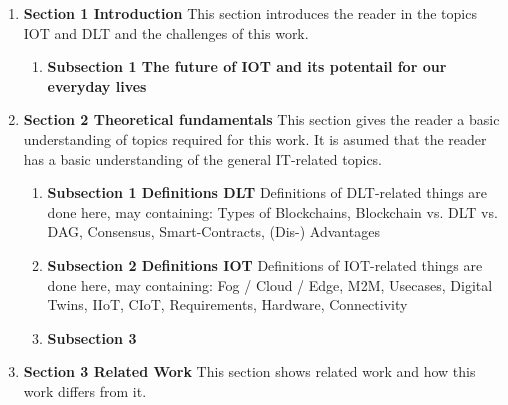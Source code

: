 \documentclass[
    ngerman,american
    ]{scrartcl}
\newcommand{\lang}{en}
\begin{document}
        \newpage

        \sectionInitialTOC{\lang}
        \sectionInitialTOCDescription{\lang}

        \begin{enumerate}
            \item \textbf{Section 1 Introduction} This section introduces the reader in the topics IOT and DLT and the challenges of this work.
                    \begin{enumerate}
                        \item \textbf{Subsection 1 The future of IOT and its potentail for our everyday lives}
                    \end{enumerate}
            \item \textbf{Section 2 Theoretical fundamentals} This section gives the reader a basic understanding of topics required for this work. It is asumed that the reader has a basic understanding of the general IT-related topics.
                    \begin{enumerate}
                        \item \textbf{Subsection 1 Definitions DLT} Definitions of DLT-related things are done here, may containing: Types of Blockchains, Blockchain vs. DLT vs. DAG, Consensus, Smart-Contracts, (Dis-) Advantages
                        \item \textbf{Subsection 2 Definitions IOT} Definitions of IOT-related things are done here, may containing: Fog / Cloud / Edge, M2M, Usecases, Digital Twins, IIoT, CIoT, Requirements, Hardware, Connectivity
                        \item \textbf{Subsection 3 }
                    \end{enumerate}
            \item \textbf{Section 3 Related Work} This section shows related work and how this work differs from it.

\end{enumerate}
\end{document}
